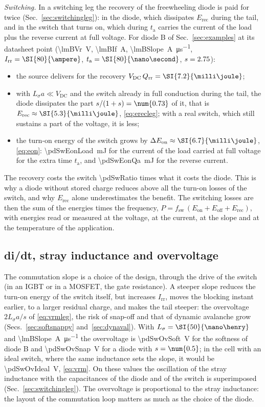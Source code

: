 \documentclass[10pt,a4paper]{scrartcl}
\newcommand{\Irr}{I_\mathrm{rr}}
\newcommand{\Qrr}{Q_\mathrm{rr}}
\newcommand{\ta}{t_\mathrm{a}}
\newcommand{\Ls}{L_\sigma}                    %
\newcommand{\Vdc}{V_\mathrm{DC}}
\newcommand{\Erec}{E_\mathrm{rec}}
\begin{document}
\emph{Switching.} In a switching leg the recovery of the freewheeling diode is paid for twice (Sec.~\ref{sec:switchingleg}): in the diode, which dissipates $\Erec$ during the tail, and in the switch that turns on, which during $\ta$ carries the current of the load plus the reverse current at full voltage. For diode B of Sec.~\ref{sec:examples} at its datasheet point (\SI{\lmBVr}{\volt}, \SI{\lmBIf}{\ampere}, \SI{\lmBSlope}{\ampere\per\micro\second}, $\Irr = \SI{\lmBIrr}{\ampere}$, $\ta = \SI{\lmBTa}{\nano\second}$, $s = 2.75$):
\begin{itemize}
\item the source delivers for the recovery $\Vdc\,\Qrr = \SI{\pdSwErecIdeal}{\milli\joule}$;
\item with $\Ls a \ll \Vdc$ and the switch already in full conduction during the tail, the diode dissipates the part $s/(1+s) = \num{\pdSwK}$ of it, that is $\Erec \approx \SI{\pdSwErecDiode}{\milli\joule}$, \eqref{eq:erecleg}; with a real switch, which still sustains a part of the voltage, it is less;
\item the turn-on energy of the switch grows by $\Delta E_\mathrm{on} \approx \SI{\pdSwEonExtra}{\milli\joule}$, \eqref{eq:eon}: \SI{\pdSwEonLoad}{\milli\joule} for the current of the load carried at full voltage for the extra time $\ta$, and \SI{\pdSwEonQa}{\milli\joule} for the reverse current.
\end{itemize}
The recovery costs the switch \num{\pdSwRatio} times what it costs the diode. This is why a diode without stored charge reduces above all the turn-on losses of the switch, and why $\Erec$ alone underestimates the benefit. The switching losses are then the sum of the energies times the frequency, $P = f_\mathrm{sw}\,(E_\mathrm{on} + E_\mathrm{off} + \Erec)$, with energies read or measured at the voltage, at the current, at the slope and at the temperature of the application.

\subsection{di/dt, stray inductance and overvoltage}
The commutation slope is a choice of the design, through the drive of the switch (in an IGBT or in a MOSFET, the gate resistance). A steeper slope reduces the turn-on energy of the switch itself, but increases $\Irr$, moves the blocking instant earlier, to a larger residual charge, and makes the tail steeper: the overvoltage $2\Ls a/s$ of \eqref{eq:vrmleg}, the risk of snap-off and that of dynamic avalanche grow (Secs.~\ref{sec:softsnappy} and~\ref{sec:dynaval}). With $\Ls = \SI{\pdSwLs}{\nano\henry}$ and \SI{\lmBSlope}{\ampere\per\micro\second} the overvoltage is \SI{\pdSwOvSoft}{\volt} for the softness of diode B and \SI{\pdSwOvSnap}{\volt} for a diode with $s = \num{\pdSwSnapS}$; in the cell with an ideal switch, where the same inductance sets the slope, it would be \SI{\pdSwOvIdeal}{\volt}, \eqref{eq:vrm}. On these values the oscillation of the stray inductance with the capacitances of the diode and of the switch is superimposed (Sec.~\ref{sec:switchingleg}). The overvoltage is proportional to the stray inductance: the layout of the commutation loop matters as much as the choice of the diode.
\end{document}
